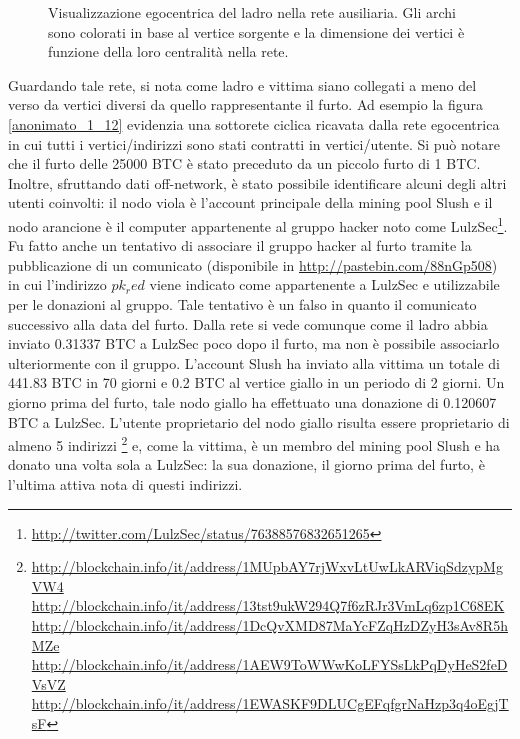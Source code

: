 \begin{figure}[htbp]
\centering
\caption{Visualizzazione egocentrica del ladro nella rete ausiliaria. Gli archi sono colorati in base al vertice sorgente e la dimensione dei vertici è funzione della loro centralità nella rete.\label{anonimato_1_11}}
\end{figure}

Guardando tale rete, si nota come ladro e vittima siano collegati a meno del verso da vertici diversi da quello rappresentante il furto. Ad esempio la figura \ref{anonimato_1_12} evidenzia una sottorete ciclica ricavata dalla rete egocentrica in cui tutti i vertici/indirizzi sono stati contratti in vertici/utente.
Si può notare che il furto delle 25000 BTC è stato preceduto da un piccolo furto di 1 BTC. Inoltre, sfruttando dati off-network, è stato possibile identificare alcuni degli altri utenti coinvolti: il nodo viola è l'account principale della mining pool Slush e il nodo arancione è il computer appartenente al gruppo hacker noto come LulzSec\footnote{\url{http://twitter.com/LulzSec/status/76388576832651265}}. Fu fatto anche un tentativo di associare il gruppo hacker al furto tramite la pubblicazione di un comunicato (disponibile in \url{http://pastebin.com/88nGp508}) in cui l'indirizzo $pk_red$ viene indicato come appartenente a LulzSec e utilizzabile per le donazioni al gruppo. Tale tentativo è un falso in quanto il comunicato successivo alla data del furto.
Dalla rete si vede comunque come il ladro abbia inviato 0.31337 BTC a LulzSec poco dopo il furto, ma non è possibile associarlo ulteriormente con il gruppo.
L'account Slush ha inviato alla vittima un totale di 441.83 BTC in 70 giorni e 0.2 BTC al vertice giallo in un periodo di 2 giorni. Un giorno prima del furto, tale nodo giallo ha effettuato una donazione di 0.120607 BTC a LulzSec. L'utente proprietario del nodo giallo risulta essere proprietario di almeno 5 indirizzi \footnote{\url{http://blockchain.info/it/address/1MUpbAY7rjWxvLtUwLkARViqSdzypMgVW4}\\ \url{http://blockchain.info/it/address/13tst9ukW294Q7f6zRJr3VmLq6zp1C68EK}\\ \url{http://blockchain.info/it/address/1DcQvXMD87MaYcFZqHzDZyH3sAv8R5hMZe}\\ \url{http://blockchain.info/it/address/1AEW9ToWWwKoLFYSsLkPqDyHeS2feDVsVZ}\\ \url{http://blockchain.info/it/address/1EWASKF9DLUCgEFqfgrNaHzp3q4oEgjTsF}} e, come la vittima, è un membro del mining pool Slush e ha donato una volta sola a LulzSec: la sua donazione, il giorno prima del furto, è l'ultima attiva nota di questi indirizzi.


